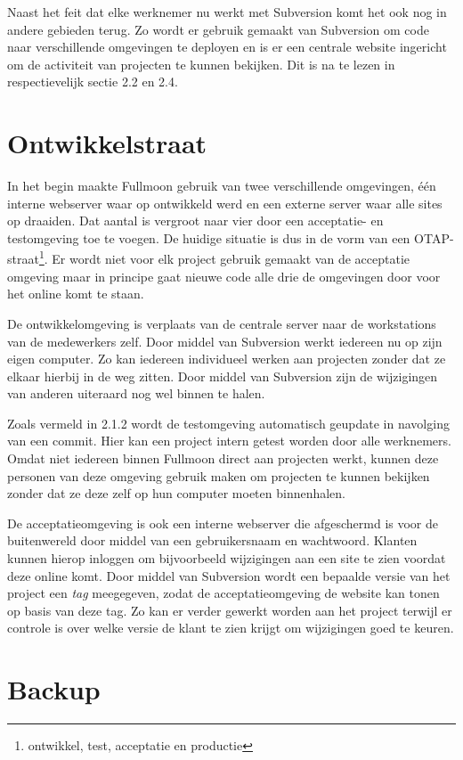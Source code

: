 Naast het feit dat elke werknemer nu werkt met Subversion komt het ook nog in andere gebieden terug. Zo wordt er gebruik gemaakt van Subversion om code naar verschillende omgevingen te deployen en is er een centrale website ingericht om de activiteit van projecten te kunnen bekijken. Dit is na te lezen in respectievelijk sectie 2.2 en 2.4.

\section{Ontwikkelstraat}

In het begin maakte Fullmoon gebruik van twee verschillende omgevingen, één interne webserver waar op ontwikkeld werd en een externe server waar alle sites op draaiden. Dat aantal is vergroot naar vier door een acceptatie- en testomgeving toe te voegen. De huidige situatie is dus in de vorm van een OTAP-straat\footnote{ontwikkel, test, acceptatie en productie}. Er wordt niet voor elk project gebruik gemaakt van de acceptatie omgeving maar in principe gaat nieuwe code alle drie de omgevingen door voor het online komt te staan.

De ontwikkelomgeving is verplaats van de centrale server naar de workstations van de medewerkers zelf. Door middel van Subversion werkt iedereen nu op zijn eigen computer. Zo kan iedereen individueel werken aan projecten zonder dat ze elkaar hierbij in de weg zitten. Door middel van Subversion zijn de wijzigingen van anderen uiteraard nog wel binnen te halen.

Zoals vermeld in 2.1.2 wordt de testomgeving automatisch geupdate in navolging van een commit. Hier kan een project intern getest worden door alle werknemers. Omdat niet iedereen binnen Fullmoon direct aan projecten werkt, kunnen deze personen van deze omgeving gebruik maken om projecten te kunnen bekijken zonder dat ze deze zelf op hun computer moeten binnenhalen.

De acceptatieomgeving is ook een interne webserver die afgeschermd is voor de buitenwereld door middel van een gebruikersnaam en wachtwoord. Klanten kunnen hierop inloggen om bijvoorbeeld wijzigingen aan een site te zien voordat deze online komt. Door middel van Subversion wordt een bepaalde versie van het project een \emph{tag} meegegeven, zodat de acceptatieomgeving de website kan tonen op basis van deze tag. Zo kan er verder gewerkt worden aan het project terwijl er controle is over welke versie de klant te zien krijgt om wijzigingen goed te keuren.

\section{Backup}

